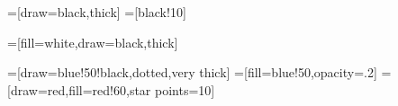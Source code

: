 =[draw=black,thick]
=[black!10]

=[fill=white,draw=black,thick]

=[draw=blue!50!black,dotted,very thick]
=[fill=blue!50,opacity=.2]
=[draw=red,fill=red!60,star points=10]